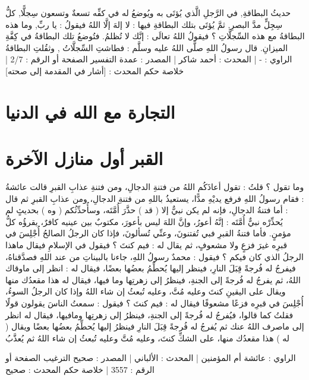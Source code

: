 حديثُ البطاقةِ, في الرَّجلِ الَّذي يُؤتَى به ويُوضعُ له في كفِّه تسعةٌ وتسعون سِجلًّا, كلُّ سِجِلٍّ مدَّ البصرِ, ثمَّ يُؤتَى بتلك البطاقةِ فيها : لا إلهَ إلَّا اللهُ فيقولُ : يا ربِّ, وما هذه البطاقةُ مع هذه السِّجلَّاتِ ؟ فيقولُ اللهُ تعالَى : إنَّك لا تُظلمُ. فتُوضعُ تلك البطاقةُ في كِفَّةِ الميزانِ. قال رسولُ اللهِ صلَّى اللهُ عليه وسلَّم : فطاشتِ السِّجلَّاتُ , وثقُلتِ البطاقةُ
الراوي : - | المحدث : أحمد شاكر | المصدر : عمدة التفسير
الصفحة أو الرقم : 2/7 | خلاصة حكم المحدث : [أشار في المقدمة إلى صحته] 

\section{التجارة مع الله في الدنيا}

\section{القبر أول منازل الآخرة}

وما تقول ؟ قلتُ : تقول أعاذَكُم اللهُ من فتنةِ الدجالِ، ومن فتنةِ عذابِ القبرِ قالت عائشةُ : فقام رسولُ اللهِ فرفع يديْهِ مدًّا، يستعيذُ باللهِ من فتنةِ الدجالِ، ومن عذابِ القبرِ ثم قال : أما فتنةُ الدجالِ، فإنه لم يكن نبيٌّ إلا ( قد ) حذَّرَ أُمَّتَه، وسأُحدِّثُكم ( وه ) بحديثٍ لم يُحذِّرْه نبيٌّ أُمَّتَه : إنَّهُ أعورُ، وإنَّ اللهَ ليس بأعورَ، مكتوبٌ بين عينيه كافرٌ، يقرؤُه كلُّ مؤمنٍ. فأما فتنةُ القبرِ فبي تُفتنونَ، وعنِّي تُسألونَ، فإذا كان الرجلُ الصالحُ أُجْلِسَ في قبرِه غيرَ فزعٍ ولا مشعوفٍ، ثم يقال له : فيم كنتَ ؟ فيقول في الإسلامِ فيقال ماهذا الرجلُ الذي كان فيكم ؟ فيقول : محمدٌ رسولُ اللهِ، جاءنا بالبيناتِ من عند اللهِ فصدَّقناهُ، فيفرجُ له فُرجةً قِبَلَ النارِ، فينظر إليها يُحطِّمُ بعضُها بعضًا، فيقال له : انظر إلى ماوقاك اللهُ، ثم يفرجُ له فُرجةً إلى الجنةِ، فينظرُ إلى زهرتِها وما فيها، فيقال له هذا مقعدُك منها ويقال على اليقينِ كنتَ وعليه مُتَّ، وعليه تُبعثُ إن شاء اللهُ وإذا كان الرجلُ السوءُ، أُجْلِسَ في قبرِه فزعًا مشعوفًا فيقال له : فيم كنتَ ؟ فيقول : سمعتُ الناسَ يقولون قولًا فقلتُ كما قالوا، فيُفرجُ له فُرجةً إلى الجنةِ، فينظرُ إلى زهرتِها ومافيها، فيقال له انظر إلى ماصرف اللهُ عنك ثم يُفرجُ له فُرجةً قِبَلَ النارِ فينظرُ إليها يُحطِّمُ بعضُها بعضًا ويقال ( له ) هذا مقعدُك منها، على الشكِّ كنتَ، وعليه مُتَّ وعليه تُبعثُ إن شاء اللهُ ثم يُعذَّبُ

الراوي : عائشة أم المؤمنين | المحدث : الألباني | المصدر : صحيح الترغيب
الصفحة أو الرقم : 3557 | خلاصة حكم المحدث : صحيح 


